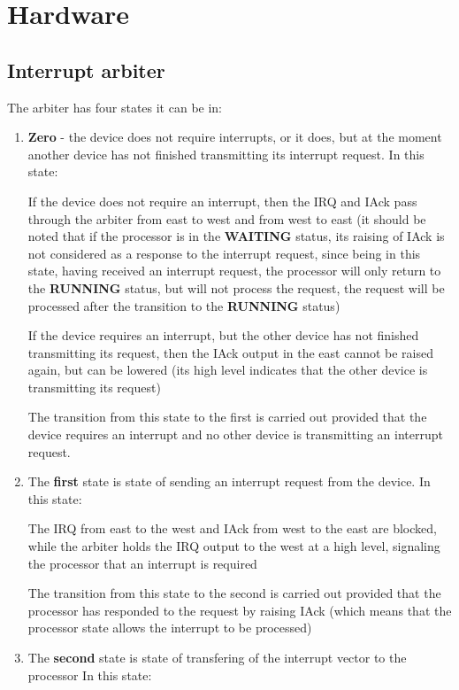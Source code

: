 \chapter*{Hardware}

\section*{Interrupt arbiter}

The arbiter has four states it can be in:

\begin{enumerate}
	\item \textbf{Zero} - the device does not require interrupts, or it does, but at the moment another device has not finished transmitting its interrupt request. In this state:

		If the device does not require an interrupt, then the IRQ and IAck pass through the arbiter from east to west and from west to east (it should be noted that if the processor is in the \textbf{WAITING} status, its raising of IAck is not considered as a response to the interrupt request, since being in this state, having received an interrupt request, the processor will only return to the \textbf{RUNNING} status, but will not process the request, the request will be processed after the transition to the \textbf{RUNNING} status)

		If the device requires an interrupt, but the other device has not finished transmitting its request, then the IAck output in the east cannot be raised again, but can be lowered (its high level indicates that the other device is transmitting its request)

		The transition from this state to the first is carried out provided that the device requires an interrupt and no other device is transmitting an interrupt request.
	\item The \textbf{first} state is state of sending an interrupt request from the device.
		In this state:

		The IRQ from east to the west and IAck from west to the east are blocked, while the arbiter holds the IRQ output to the west at a high level, signaling the processor that an interrupt is required

		The transition from this state to the second is carried out provided that the processor has responded to the request by raising IAck (which means that the processor state allows the interrupt to be processed)
	\item The \textbf{second} state is state of transfering of the interrupt vector to the processor
		In this state:


\end{enumerate}
